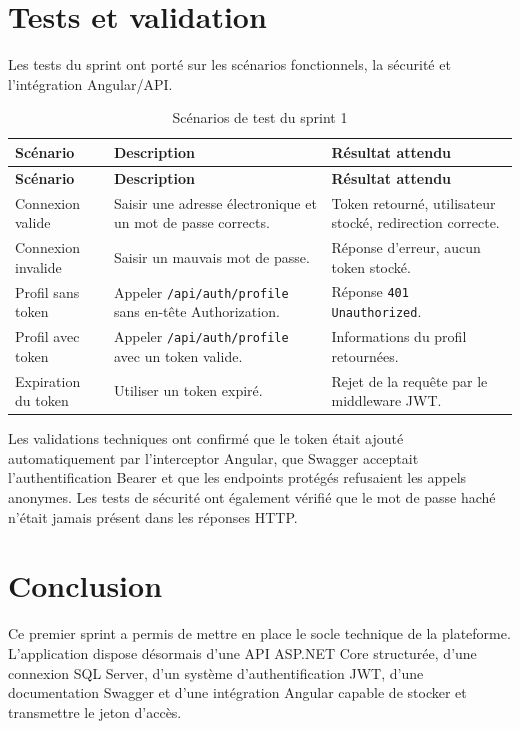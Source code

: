 \documentclass[12pt,a4paper]{report}
\begin{document}
\section{Tests et validation}

Les tests du sprint ont porté sur les scénarios fonctionnels, la sécurité et l'intégration Angular/API.

\begin{longtable}{p{} p{} p{}}
\caption{Scénarios de test du sprint 1}\\
\toprule
\textbf{Scénario} & \textbf{Description} & \textbf{Résultat attendu}\\
\midrule
\endfirsthead
\toprule
\textbf{Scénario} & \textbf{Description} & \textbf{Résultat attendu}\\
\midrule
\endhead
Connexion valide & Saisir une adresse électronique et un mot de passe corrects. & Token retourné, utilisateur stocké, redirection correcte.\\
\midrule
Connexion invalide & Saisir un mauvais mot de passe. & Réponse d'erreur, aucun token stocké.\\
\midrule
Profil sans token & Appeler \texttt{/api/auth/profile} sans en-tête Authorization. & Réponse \texttt{401 Unauthorized}.\\
\midrule
Profil avec token & Appeler \texttt{/api/auth/profile} avec un token valide. & Informations du profil retournées.\\
\midrule
Expiration du token & Utiliser un token expiré. & Rejet de la requête par le middleware JWT.\\
\bottomrule
\end{longtable}

Les validations techniques ont confirmé que le token était ajouté automatiquement par l'interceptor Angular, que Swagger acceptait l'authentification Bearer et que les endpoints protégés refusaient les appels anonymes. Les tests de sécurité ont également vérifié que le mot de passe haché n'était jamais présent dans les réponses HTTP.

\section{Conclusion}

Ce premier sprint a permis de mettre en place le socle technique de la plateforme. L'application dispose désormais d'une API ASP.NET Core structurée, d'une connexion SQL Server, d'un système d'authentification JWT, d'une documentation Swagger et d'une intégration Angular capable de stocker et transmettre le jeton d'accès.
\end{document}
